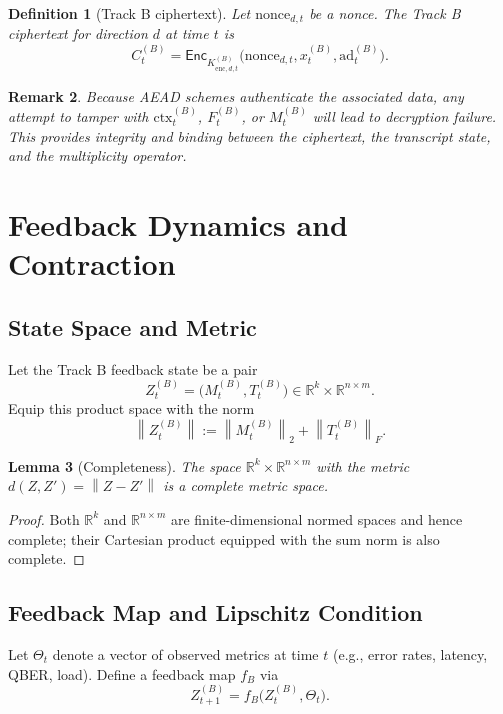\documentclass[11pt]{article}
\newtheorem{definition}{Definition}[section]
\newtheorem{remark}[definition]{Remark}
\newtheorem{lemma}[definition]{Lemma}
\newcommand{\R}{\mathbb{R}}
\newcommand{\Enc}{\mathsf{Enc}}
\newcommand{\norm}[1]{\left\lVert #1 \right\rVert}
\begin{document}
\begin{definition}[Track B ciphertext]
Let \(\mathrm{nonce}_{d,t}\) be a nonce.
The Track B ciphertext for direction \(d\) at time \(t\) is
\[
  C_t^{(B)} = \Enc_{K_{\mathrm{enc},d,t}^{(B)}}\bigl(\mathrm{nonce}_{d,t}, x_t^{(B)}, \mathrm{ad}_t^{(B)}\bigr).
\]
\end{definition}

\begin{remark}
Because AEAD schemes authenticate the associated data, any attempt to tamper with \(\mathrm{ctx}_t^{(B)}\), \(F_t^{(B)}\), or \(M_t^{(B)}\) will lead to decryption failure.
This provides integrity and binding between the ciphertext, the transcript state, and the multiplicity operator.
\end{remark}

\section{Feedback Dynamics and Contraction}

\subsection{State Space and Metric}

Let the Track B feedback state be a pair
\[
  Z_t^{(B)} = \bigl(M_t^{(B)}, T_t^{(B)}\bigr) \in \R^k \times \R^{n \times m}.
\]
Equip this product space with the norm
\[
  \norm{Z_t^{(B)}} := \norm{M_t^{(B)}}_2 + \norm{T_t^{(B)}}_F.
\]

\begin{lemma}[Completeness]
The space \(\R^k \times \R^{n \times m}\) with the metric \(d(Z,Z') = \norm{Z-Z'}\) is a complete metric space.
\end{lemma}

\begin{proof}
Both \(\R^k\) and \(\R^{n \times m}\) are finite-dimensional normed spaces and hence complete; their Cartesian product equipped with the sum norm is also complete.
\end{proof}

\subsection{Feedback Map and Lipschitz Condition}

Let \(\Theta_t\) denote a vector of observed metrics at time \(t\) (e.g., error rates, latency, QBER, load).
Define a feedback map \(f_B\) via
\[
  Z_{t+1}^{(B)} = f_B\bigl(Z_t^{(B)}, \Theta_t\bigr).
\]
\end{document}
